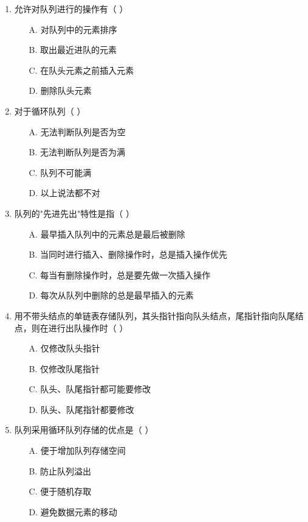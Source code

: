 \documentclass[12pt, a4paper]{article}
\begin{document}
\begin{enumerate}[label=\arabic*.]
	\item 允许对队列进行的操作有（ ）
	      \begin{enumerate}
		      \item[A.] 对队列中的元素排序
		      \item[B.] 取出最近进队的元素
		      \item[C.] 在队头元素之前插入元素
		      \item[D.] 删除队头元素
	      \end{enumerate}

	\item 对于循环队列（ ）
	      \begin{enumerate}
		      \item[A.] 无法判断队列是否为空
		      \item[B.] 无法判断队列是否为满
		      \item[C.] 队列不可能满
		      \item[D.] 以上说法都不对
	      \end{enumerate}

	\item 队列的"先进先出"特性是指（ ）
	      \begin{enumerate}
		      \item[A.] 最早插入队列中的元素总是最后被删除
		      \item[B.] 当同时进行插入、删除操作时，总是插入操作优先
		      \item[C.] 每当有删除操作时，总是要先做一次插入操作
		      \item[D.] 每次从队列中删除的总是最早插入的元素
	      \end{enumerate}

	\item 用不带头结点的单链表存储队列，其头指针指向队头结点，尾指针指向队尾结点，则在进行出队操作时（ ）
	      \begin{enumerate}
		      \item[A.] 仅修改队头指针
		      \item[B.] 仅修改队尾指针
		      \item[C.] 队头、队尾指针都可能要修改
		      \item[D.] 队头、队尾指针都要修改
	      \end{enumerate}

	\item 队列采用循环队列存储的优点是（ ）
	      \begin{enumerate}
		      \item[A.] 便于增加队列存储空间
		      \item[B.] 防止队列溢出
		      \item[C.] 便于随机存取
		      \item[D.] 避免数据元素的移动
	      \end{enumerate}


\end{enumerate}
\end{document}
